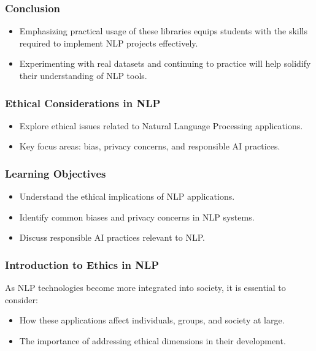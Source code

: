 \documentclass[aspectratio=169]{beamer}
\begin{document}
\begin{frame}[fragile]
    \frametitle{Conclusion}
    \begin{itemize}
        \item Emphasizing practical usage of these libraries equips students with the skills required to implement NLP projects effectively.
        \item Experimenting with real datasets and continuing to practice will help solidify their understanding of NLP tools.
    \end{itemize}
\end{frame}

\begin{frame}
    \frametitle{Ethical Considerations in NLP}
    \begin{itemize}
        \item Explore ethical issues related to Natural Language Processing applications.
        \item Key focus areas: bias, privacy concerns, and responsible AI practices.
    \end{itemize}
\end{frame}

\begin{frame}
    \frametitle{Learning Objectives}
    \begin{itemize}
        \item Understand the ethical implications of NLP applications.
        \item Identify common biases and privacy concerns in NLP systems.
        \item Discuss responsible AI practices relevant to NLP.
    \end{itemize}
\end{frame}

\begin{frame}
    \frametitle{Introduction to Ethics in NLP}
    As NLP technologies become more integrated into society, it is essential to consider:
    \begin{itemize}
        \item How these applications affect individuals, groups, and society at large.
        \item The importance of addressing ethical dimensions in their development.
    \end{itemize}
\end{frame}
\end{document}
